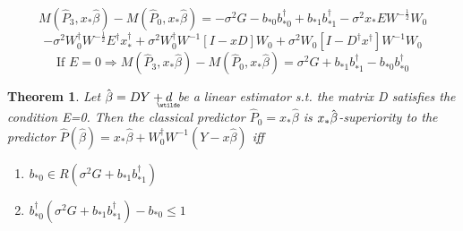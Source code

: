 \documentclass{article}
\newtheorem{theorem}{Theorem}
\begin{document}
\bigskip

\bigskip

\begin{equation*}
M\left( \hat{P}_{3},x_{\ast }\hat{\beta}\right) -M\left( \hat{P}_{0},x_{\ast
}\hat{\beta}\right) =-\sigma ^{2}G-b_{\ast 0}b_{\ast 0}^{\dagger }+b_{\ast
1}b_{\ast 1}^{\dagger }-\sigma ^{2}x_{\ast }EW^{-\frac{1}{2}}W_{0}
\end{equation*}%
\begin{equation*}
-\sigma ^{2}W_{0}^{\dagger }W^{-\frac{1}{2}}E^{\dagger }x_{\ast }^{\dagger
}+\sigma ^{2}W_{0}^{\dagger }W^{-1}\left[ I-xD\right] W_{0}+\sigma ^{2}W_{0}%
\left[ I-D^{\dagger }x^{\dagger }\right] W^{-1}W_{0}
\end{equation*}%
\begin{equation*}
\text{If }E=0\Rightarrow M\left( \hat{P}_{3},x_{\ast }\hat{\beta}\right)
-M\left( \hat{P}_{0},x_{\ast }\hat{\beta}\right) =\sigma ^{2}G+b_{\ast
1}b_{\ast 1}^{\dagger }-b_{\ast 0}b_{\ast 0}^{\dagger }
\end{equation*}

\bigskip

\begin{theorem}
Let $\hat{\beta}=DY+%
\underaccent{\wtilde}{d}%
$ be a linear estimator s.t. the matrix D satisfies the condition E=0. Then
the classical predictor $\hat{P}_{0}=x_{\ast }\hat{\beta}$ is $x_{\ast }\hat{%
\beta}$-superiority to the predictor $\hat{P}\left( \hat{\beta}\right)
=x_{\ast }\hat{\beta}+W_{0}^{\dagger }W^{-1}\left( Y-x\hat{\beta}\right) $
iff

\begin{enumerate}
\item b$_{\ast 0}\in R\left( \sigma ^{2}G+b_{\ast 1}b_{\ast 1}^{\dagger
}\right) $

\item b$_{\ast 0}^{\dagger }\left( \sigma ^{2}G+b_{\ast 1}b_{\ast
1}^{\dagger }\right) -b_{\ast 0}\leq 1$
\end{enumerate}
\end{theorem}

\bigskip
\end{document}
